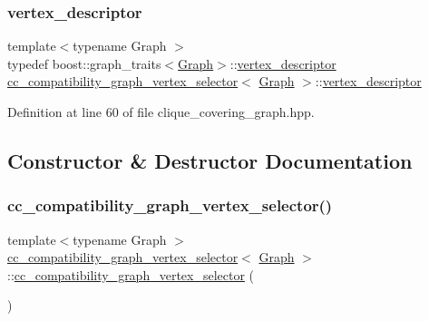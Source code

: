 \subsubsection{\texorpdfstring{vertex\+\_\+descriptor}{vertex\_descriptor}}
{\footnotesize\ttfamily template$<$typename Graph $>$ \\
typedef boost\+::graph\+\_\+traits$<$\hyperlink{structGraph}{Graph}$>$\+::\hyperlink{structcc__compatibility__graph__vertex__selector_a445b79c6570f741f69230996f98df72b}{vertex\+\_\+descriptor} \hyperlink{structcc__compatibility__graph__vertex__selector}{cc\+\_\+compatibility\+\_\+graph\+\_\+vertex\+\_\+selector}$<$ \hyperlink{structGraph}{Graph} $>$\+::\hyperlink{structcc__compatibility__graph__vertex__selector_a445b79c6570f741f69230996f98df72b}{vertex\+\_\+descriptor}}



Definition at line 60 of file clique\+\_\+covering\+\_\+graph.\+hpp.



\subsection{Constructor \& Destructor Documentation}
\mbox{\label{structcc__compatibility__graph__vertex__selector_abe02d814700d4140257b4dd840741aa4}} 
\subsubsection{\texorpdfstring{cc\+\_\+compatibility\+\_\+graph\+\_\+vertex\+\_\+selector()}{cc\_compatibility\_graph\_vertex\_selector()}\hspace{0.1cm}{\footnotesize\ttfamily [1/2]}}
{\footnotesize\ttfamily template$<$typename Graph $>$ \\
\hyperlink{structcc__compatibility__graph__vertex__selector}{cc\+\_\+compatibility\+\_\+graph\+\_\+vertex\+\_\+selector}$<$ \hyperlink{structGraph}{Graph} $>$\+::\hyperlink{structcc__compatibility__graph__vertex__selector}{cc\+\_\+compatibility\+\_\+graph\+\_\+vertex\+\_\+selector} (\begin{DoxyParamCaption}{ }\end{DoxyParamCaption})\hspace{0.3cm}{\ttfamily [inline]}}



